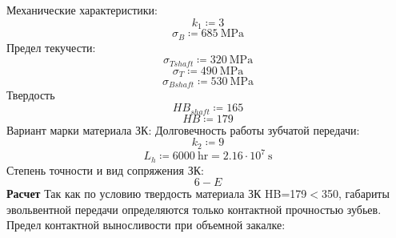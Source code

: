 \documentclass{article}
\newcommand{\defeq}{\coloneq} %
\begin{document}
\colorbox[HTML]{000000}{Механические характеристики:}\newline
\begin{equation*}
\textit{k}_{\textit{1}} \defeq 3
\end{equation*}
\begin{equation*}
σ_{B} \defeq 685 \: \mathrm{MPa}
\end{equation*}
\colorbox[HTML]{000000}{Предел текучести:}\newline
\begin{equation*}
σ_{Tshaft} \defeq 320 \: \mathrm{MPa}
\end{equation*}
\begin{equation*}
σ_{T} \defeq 490 \: \mathrm{MPa}
\end{equation*}
\begin{equation*}
σ_{Bshaft} \defeq 530 \: \mathrm{MPa}
\end{equation*}
\colorbox[HTML]{000000}{Твердость }\newline
\begin{equation*}
HB_{shaft} \defeq 165
\end{equation*}
\begin{equation*}
HB \defeq 179
\end{equation*}
\colorbox[HTML]{000000}{Вариант марки материала ЗК:}\newline
\colorbox[HTML]{000000}{Долговечность работы зубчатой передачи:}\newline
\begin{equation*}
\textit{k}_{\textit{2}} \defeq 9
\end{equation*}
\begin{equation*}
L_{h} \defeq 6000 \: \mathrm{hr} = {2.16 \cdot 10^{7} \: \mathrm{s}}
\end{equation*}
\colorbox[HTML]{000000}{Степень точности и вид сопряжения ЗК:}\newline
\begin{equation*}
6-E
\end{equation*}
\colorbox[HTML]{000000}{\textbf{Расчет }}\newline
\colorbox[HTML]{000000}{Так как по условию твердость материала ЗК HB=179$<$350, габариты \newline
эвольвентной передачи определяются только контактной прочностью зубьев.}\newline
\colorbox[HTML]{000000}{Предел контактной выносливости при объемной закалке:}\newline
\end{document}
